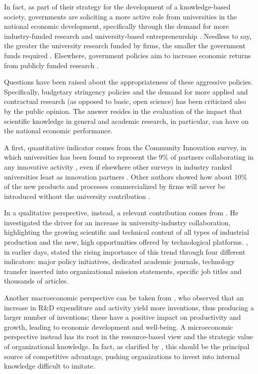 In fact, as part of their strategy for the development of a knowledge-based society, governments are soliciting a more active role from universities in the national economic development, specifically through the demand for more industry-funded research \citep{Geuna2009} and university-based entrepreneurship \citep{OShea2004}. Needless to say, the greater the university research funded by firms, the smaller the government funds required \citep{Yusuf2008}. Elsewhere, government policies aim to increase economic returns from publicly funded research \citep{Bercovitz2006}.

Questions have been raised about the appropriateness of these aggressive policies. Specifically, budgetary stringency policies and the demand for more applied and contractual research (as opposed to basic, open science) has been criticized also by the public opinion. The answer resides in the evaluation of the impact that scientific knowledge in general and academic research, in particular, can have on the national economic performance.

A first, quantitative indicator comes from the Community Innovation survey, in which universities has been found to represent the 9\% of partners collaborating in any innovative activity \citep{Muscio2008}, even if elsewhere other surveys in industry ranked universities least as innovation partners \citep{Yusuf2008}. Other authors showed how about 10\% of the new products and processes commercialized by firms will never be introduced without the university contribution \citep{Bekkers2008}. 

In a qualitative perspective, instead, a relevant contribution comes from \citet{Bercovitz2006}. He investigated the driver for an increase in university-industry collaboration, highlighting the growing scientific and technical content of all types of industrial production and the new, high opportunities offered by technological platforms. \citet{Bozeman2000}, in earlier days, stated the rising importance of this trend through four different indicators: major policy initiatives, dedicated academic journals, technology transfer inserted into organizational mission statements, specific job titles and thousands of articles. 

Another macroeconomic perspective can be taken from \citet{Markman2005}, who observed that an increase in R\&D expenditure and activity yield more inventions, thus producing a larger number of inventions; these have a positive impact on productivity and growth, leading to economic development and well-being. A microeconomic perspective instead has its root in the resource-based view \citep{Wernerfelt1984} and the strategic value of organizational knowledge. In fact, as clarified by \citet{Argote2000}, this should be the principal source of competitive advantage, pushing organizations to invest into internal knowledge difficult to imitate.

